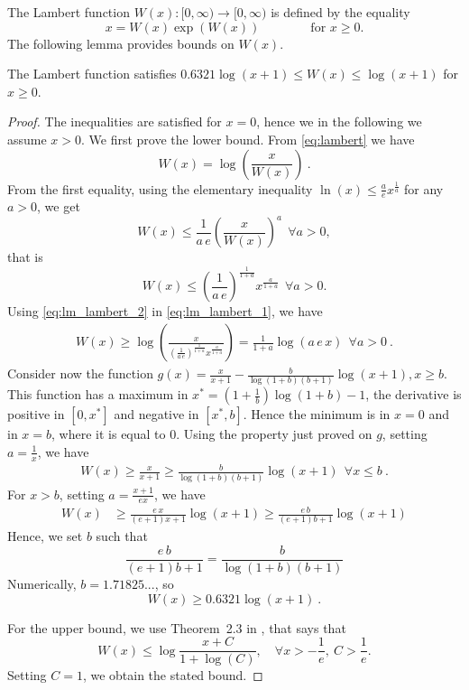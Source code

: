 The Lambert function $W(x):[0,\infty) \to [0,\infty)$ is defined by the equality
\begin{equation}
\label{eq:lambert}
x=W(x) \exp \left(W(x)\right) \qquad \qquad \text{for $x \ge 0$}.
\end{equation}
The following lemma provides bounds on $W(x)$.

\begin{lemma}
\label{lemma:lambert}
The Lambert function satisfies $0.6321 \log(x+1) \leq W(x) \leq \log(x+1)$ for $x \ge 0$.
\end{lemma}
%
\begin{proof}
The inequalities are satisfied for $x=0$, hence we in the following we assume $x>0$.
We first prove the lower bound. From \eqref{eq:lambert} we have
\begin{equation}
W(x) = \log\left(\frac{x}{W(x)}\right)~. \label{eq:lm_lambert_1}
\end{equation}
From the first equality, using the elementary inequality $\ln (x) \leq \frac{a}{e} x^\frac{1}{a}$ for any $a>0$, we get
\[
W(x) \leq \frac{1}{a\, e}\left(\frac{x}{W(x)}\right)^a  \ \ \forall a>0,
\]
that is
\begin{equation}
\label{eq:lm_lambert_2}
W(x) \leq \left(\frac{1}{a\, e}\right)^\frac{1}{1+a} x^\frac{a}{1+a} \ \ \forall a>0.
\end{equation}
Using \eqref{eq:lm_lambert_2} in \eqref{eq:lm_lambert_1}, we have
\begin{align*}
W(x)
\geq \log\left(\frac{x}{\left(\frac{1}{a\, e}\right)^\frac{1}{1+a} x^\frac{a}{1+a}}\right)
= \frac{1}{1+a}\log\left(a \, e\, x\right) \ \ \forall a>0~.
\end{align*}
Consider now the function $g(x)=\frac{x}{x+1} - \frac{b}{\log(1+b) (b+1)}
\log(x+1), x\geq b$. This function has a maximum in $x^*=(1+\frac{1}{b})
\log(1+b)-1$, the derivative is positive in $[0,x^*]$ and negative in
$[x^*,b]$. Hence the minimum is in $x=0$ and in $x=b$, where it is equal to
$0$.  Using the property just proved on $g$, setting $a=\frac{1}{x}$, we have
\begin{align*}
W(x)
\geq \frac{x}{x+1} \geq \frac{b}{\log(1+b) (b+1)} \log(x+1) \ \  \forall x\leq b~.
\end{align*}
For $x>b$, setting $a=\frac{x+1}{e x}$, we have
\begin{align}
W(x)
&\geq \frac{e\,x}{(e+1) x + 1} \log(x+1) \geq \frac{e\,b}{(e+1) b + 1} \log(x+1)
\end{align}
Hence, we set $b$ such that
\[
\frac{e\, b}{(e+1)b + 1} = \frac{b}{\log(1+b) (b+1)}
\]
Numerically, $b=1.71825...$, so
\[
W(x) \geq 0.6321 \log(x+1)~.
\]

For the upper bound, we use Theorem~2.3 in \cite{Hoorfar-Hassani-2008}, that says that
\[
W(x) \leq \log\frac{x+C}{1+\log(C)}, \quad \forall x> -\frac{1}{e}, \ C>\frac{1}{e}.
\]
Setting $C=1$, we obtain the stated bound.
\end{proof}

